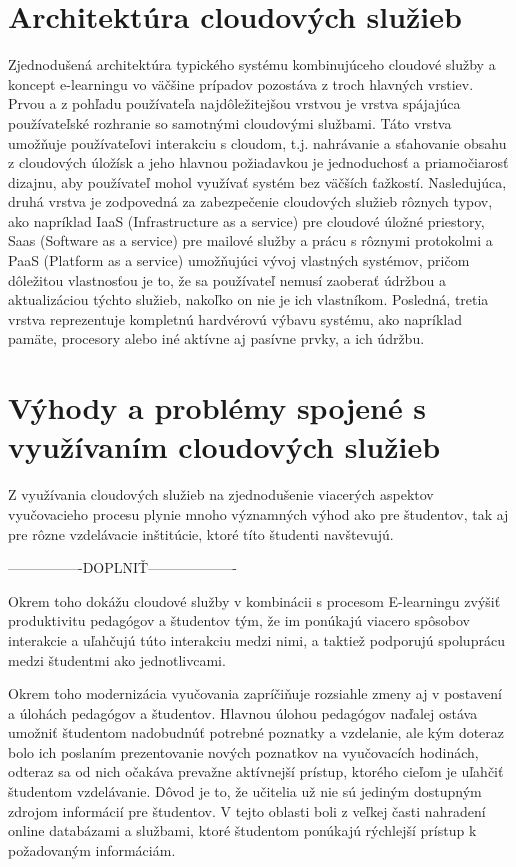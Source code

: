 \documentclass[10pt,slovak,a4paper]{article}%
\begin{document}
\section{Architektúra cloudových služieb}


Zjednodušená architektúra typického systému kombinujúceho cloudové služby a koncept e-learningu vo väčšine prípadov pozostáva z troch hlavných vrstiev. Prvou a z pohľadu používateľa najdôležitejšou vrstvou je vrstva spájajúca používateľské rozhranie so samotnými cloudovými službami\cite{Mhouti_benefits_challenges}. Táto vrstva umožňuje používateľovi interakciu s cloudom, t.j. nahrávanie a sťahovanie obsahu z cloudových úložísk a jeho hlavnou požiadavkou je jednoduchosť a priamočiarosť dizajnu, aby používateľ mohol využívať systém bez väčších ťažkostí. Nasledujúca, druhá vrstva je zodpovedná za zabezpečenie cloudových služieb rôznych typov, ako napríklad IaaS (Infrastructure as a service) pre cloudové úložné priestory, Saas (Software as a service) pre mailové služby a prácu s rôznymi protokolmi a PaaS (Platform as a service) umožňujúci vývoj vlastných systémov, pričom dôležitou vlastnosťou je to, že sa používateľ nemusí zaoberať údržbou a aktualizáciou týchto služieb, nakoľko on nie je ich vlastníkom\cite{Mhouti_benefits_challenges}. Posledná, tretia vrstva reprezentuje kompletnú hardvérovú výbavu systému, ako napríklad pamäte, procesory alebo iné aktívne aj pasívne prvky, a ich údržbu\cite{Mhouti_benefits_challenges}.


\section{Výhody a problémy spojené s využívaním cloudových služieb}


Z využívania cloudových služieb na zjednodušenie viacerých aspektov vyučovacieho procesu plynie mnoho významných výhod ako pre študentov, tak aj pre rôzne vzdelávacie inštitúcie, ktoré títo študenti navštevujú.

----------------DOPLNIŤ-------------------

Okrem toho dokážu cloudové služby v kombinácii s procesom E-learningu zvýšiť produktivitu pedagógov a študentov tým, že im ponúkajú viacero spôsobov interakcie a uľahčujú túto interakciu medzi nimi, a taktiež podporujú spoluprácu medzi študentmi ako jednotlivcami\cite{Mhouti_benefits_challenges}.

Okrem toho modernizácia vyučovania zapríčiňuje rozsiahle zmeny aj v postavení a úlohách pedagógov a študentov\cite{Koutsopoulos_schooloncloud}. Hlavnou úlohou pedagógov naďalej ostáva umožniť študentom nadobudnúť potrebné poznatky a vzdelanie, ale kým doteraz bolo ich poslaním prezentovanie nových poznatkov na vyučovacích hodinách, odteraz sa od nich očakáva prevažne aktívnejší prístup, ktorého cieľom je uľahčiť študentom vzdelávanie\cite{Koutsopoulos_schooloncloud}. Dôvod je to, že učitelia už nie sú jediným dostupným zdrojom informácií pre študentov. V tejto oblasti boli z veľkej časti nahradení online databázami a službami, ktoré študentom ponúkajú rýchlejší prístup k požadovaným informáciám.
\end{document}
